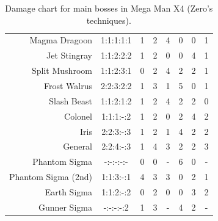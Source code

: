 \begin{table}[htp]
{\begin{tabular}{r *{7}{c}}
		Magma Dragoon   		&1:1:1:1:1&1&   2&   4&   0&   0&   1\\
		Jet Stingray    		&1:1:2:2:2&1&   2&   0&   0&   4&   1\\
		Split Mushroom  		&1:1:2:3:1&0&   2&   4&   2&   2&   1\\
		Frost Walrus    		&2:2:3:2:2&1&   3&   1&   5&   0&   1\\
		Slash Beast     		&1:1:2:1:2&1&   2&   4&   2&   2&   0\\
		Colonel         		&1:1:1:-:2&1&   2&   0&   2&   4&   2\\
		Iris            		&2:2:3:-:3&1&   2&   1&   4&   2&   2\\
		General         		&2:2:4:-:3&1&   4&   3&   2&   2&   3\\
		Phantom Sigma           &-:-:-:-:-&0&   0&   -&   6&   0&   -\\
		Phantom Sigma (2nd)     &1:1:3:-:1&4&   3&   3&   0&   2&   1\\
		Earth Sigma     		&1:1:2:-:2&0&   2&   0&   0&   3&   2\\
		Gunner Sigma    		&-:-:-:-:2&1&   3&   -&   4&   2&   -\\
		\bottomrule
		\end{tabular}
	}	
	\caption{Damage chart for main bosses in Mega Man X4 (Zero's techniques).}
\end{table}